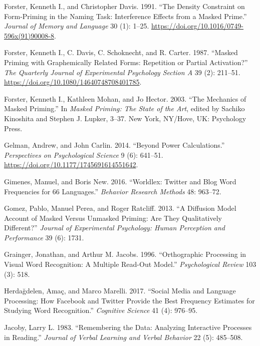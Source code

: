 \documentclass[
]{interact}
\newlength{\cslhangindent}
\newenvironment{CSLReferences}[2] %
 {\begin{list}{}{%
  \setlength{\itemindent}{0pt}
  \setlength{\leftmargin}{0pt}
  \setlength{\parsep}{0pt}
  \ifodd #1
   \setlength{\leftmargin}{\cslhangindent}
   \setlength{\itemindent}{-1\cslhangindent}
  \fi
  \setlength{\itemsep}{#2\baselineskip}}}
 {\end{list}}
\begin{document}
\begin{CSLReferences}{1}{0}
Forster, Kenneth I., and Christopher Davis. 1991. {``The Density
Constraint on Form-Priming in the Naming Task: Interference Effects from
a Masked Prime.''} \emph{Journal of Memory and Language} 30 (1): 1--25.
\url{https://doi.org/10.1016/0749-596x(91)90008-8}.

Forster, Kenneth I., C. Davis, C. Schoknecht, and R. Carter. 1987.
{``Masked Priming with Graphemically Related Forms: Repetition or
Partial Activation?''} \emph{The Quarterly Journal of Experimental
Psychology Section A} 39 (2): 211--51.
\url{https://doi.org/10.1080/14640748708401785}.

Forster, Kenneth I., Kathleen Mohan, and Jo Hector. 2003. {``The
Mechanics of Masked Priming.''} In \emph{Masked Priming: The State of
the Art}, edited by Sachiko Kinoshita and Stephen J. Lupker, 3--37. New
York, NY/Hove, UK: Psychology Press.

Gelman, Andrew, and John Carlin. 2014. {``Beyond Power Calculations.''}
\emph{Perspectives on Psychological Science} 9 (6): 641--51.
\url{https://doi.org/10.1177/1745691614551642}.

Gimenes, Manuel, and Boris New. 2016. {``Worldlex: Twitter and Blog Word
Frequencies for 66 Languages.''} \emph{Behavior Research Methods} 48:
963--72.

Gomez, Pablo, Manuel Perea, and Roger Ratcliff. 2013. {``A Diffusion
Model Account of Masked Versus Unmasked Priming: Are They Qualitatively
Different?''} \emph{Journal of Experimental Psychology: Human Perception
and Performance} 39 (6): 1731.

Grainger, Jonathan, and Arthur M. Jacobs. 1996. {``Orthographic
Processing in Visual Word Recognition: A Multiple Read-Out Model.''}
\emph{Psychological Review} 103 (3): 518.

Herdağdelen, Amaç, and Marco Marelli. 2017. {``Social Media and Language
Processing: How Facebook and Twitter Provide the Best Frequency
Estimates for Studying Word Recognition.''} \emph{Cognitive Science} 41
(4): 976--95.

Jacoby, Larry L. 1983. {``Remembering the Data: Analyzing Interactive
Processes in Reading.''} \emph{Journal of Verbal Learning and Verbal
Behavior} 22 (5): 485--508.


\end{CSLReferences}
\end{document}
